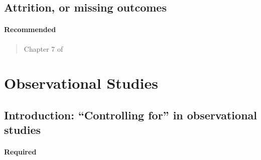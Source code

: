\documentclass[12pt]{article}
\begin{document}
\begin{verse}  \end{verse}

\begin{verse}  \end{verse}

\begin{verse}  \end{verse}

\subsection{Attrition, or missing outcomes}

\paragraph*{Recommended}

\begin{verse} Chapter 7 of  \end{verse}

\begin{verse}  \end{verse}

\begin{verse}  \end{verse}

\begin{verse}  \end{verse}

\section{Observational Studies}

\subsection{Introduction:  ``Controlling for'' in observational studies}

\paragraph*{Required}

\begin{verse}  \end{verse}
\end{document}

